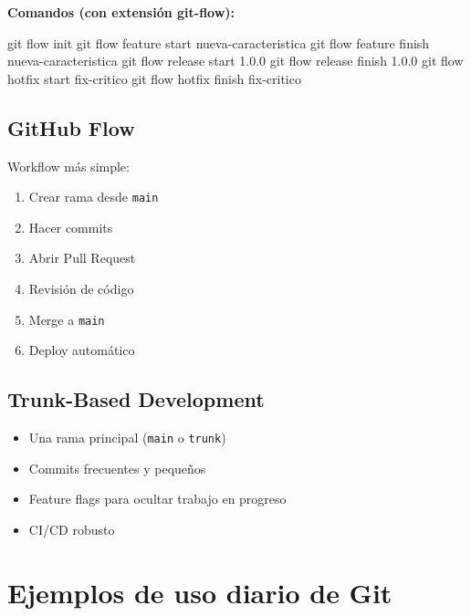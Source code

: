 \documentclass[
  doc,
  floatsintext,
  longtable,
  a4paper,
  nolmodern,
  notxfonts,
  notimes,
  12pt,
  colorlinks=true,linkcolor=blue,citecolor=blue,urlcolor=blue]{apa7}
\newenvironment{Shaded}{\begin{snugshade}}{\end{snugshade}}
\newcommand{\FunctionTok}[1]{\textcolor[rgb]{0.28,0.35,0.67}{#1}}
\newcommand{\NormalTok}[1]{\textcolor[rgb]{0.00,0.23,0.31}{#1}}
\providecommand{\tightlist}{%
  \setlength{\itemsep}{0pt}\setlength{\parskip}{0pt}}
\begin{document}
\textbf{Comandos (con extensión git-flow):}

\begin{Shaded}
\begin{Highlighting}[]
\FunctionTok{git}\NormalTok{ flow init}
\FunctionTok{git}\NormalTok{ flow feature start nueva{-}caracteristica}
\FunctionTok{git}\NormalTok{ flow feature finish nueva{-}caracteristica}
\FunctionTok{git}\NormalTok{ flow release start 1.0.0}
\FunctionTok{git}\NormalTok{ flow release finish 1.0.0}
\FunctionTok{git}\NormalTok{ flow hotfix start fix{-}critico}
\FunctionTok{git}\NormalTok{ flow hotfix finish fix{-}critico}
\end{Highlighting}
\end{Shaded}

\subsection{GitHub Flow}\label{github-flow}

Workflow más simple:

\begin{enumerate}
\def\labelenumi{\arabic{enumi}.}
\tightlist
\item
  Crear rama desde \texttt{main}
\item
  Hacer commits
\item
  Abrir Pull Request
\item
  Revisión de código
\item
  Merge a \texttt{main}
\item
  Deploy automático
\end{enumerate}

\subsection{Trunk-Based Development}\label{trunk-based-development}

\begin{itemize}
\tightlist
\item
  Una rama principal (\texttt{main} o \texttt{trunk})
\item
  Commits frecuentes y pequeños
\item
  Feature flags para ocultar trabajo en progreso
\item
  CI/CD robusto
\end{itemize}

\section{Ejemplos de uso diario de
Git}\label{ejemplos-de-uso-diario-de-git}
\end{document}
